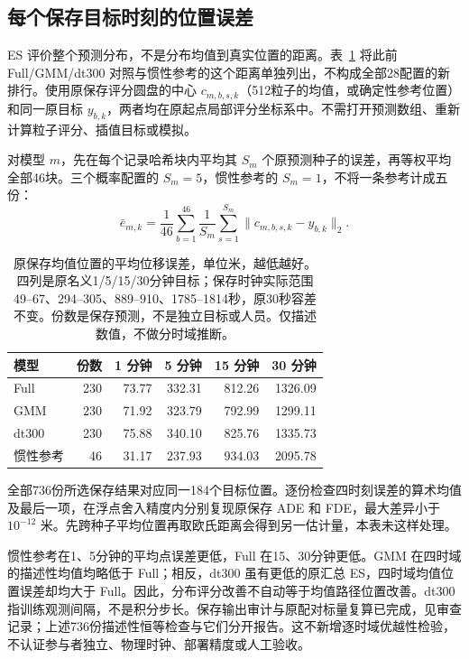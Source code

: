 \FloatBarrier
\subsection{每个保存目标时刻的位置误差}
\label{sec:point-error-horizons}
ES 评价整个预测分布，不是分布均值到真实位置的距离。表~\ref{tab:point-error-horizons} 将此前 Full/GMM/dt300 对照与惯性参考的这个距离单独列出，不构成全部28配置的新排行。使用原保存评分圆盘的中心 $c_{m,b,s,k}$（512粒子的均值，或确定性参考位置）和同一原目标 $y_{b,k}$，两者均在原起点局部评分坐标系中。不需打开预测数组、重新计算粒子评分、插值目标或模拟。

对模型 $m$，先在每个记录哈希块内平均其 $S_m$ 个原预测种子的误差，再等权平均全部46块。三个概率配置的 $S_m=5$，惯性参考的 $S_m=1$，不将一条参考计成五份：
\begin{equation}
\bar e_{m,k}=\frac{1}{46}\sum_{b=1}^{46}
\frac{1}{S_m}\sum_{s=1}^{S_m}\lVert c_{m,b,s,k}-y_{b,k}\rVert_2.
\label{eq:point-error-horizon-mean}
\end{equation}

\begin{table}[htbp]\centering\small
\caption{原保存均值位置的平均位移误差，单位米，越低越好。四列是原名义1/5/15/30分钟目标；保存时钟实际范围49--67、294--305、889--910、1785--1814秒，原30秒容差不变。份数是保存预测，不是独立目标或人员。仅描述数值，不做分时域推断。}\label{tab:point-error-horizons}
\begin{tabular}{@{}lrrrrr@{}}\toprule
模型 & 份数 & 1 分钟 & 5 分钟 & 15 分钟 & 30 分钟\\\midrule
Full & 230 & 73.77 & 332.31 & 812.26 & 1326.09\\
GMM & 230 & 71.92 & 323.79 & 792.99 & 1299.11\\
dt300 & 230 & 75.88 & 340.10 & 825.76 & 1335.73\\
惯性参考 & 46 & 31.17 & 237.93 & 934.03 & 2095.78\\
\bottomrule\end{tabular}\end{table}

全部736份所选保存结果对应同一184个目标位置。逐份检查四时刻误差的算术均值及最后一项，在浮点舍入精度内分别复现原保存 ADE 和 FDE，最大差异小于 $10^{-12}$ 米。先跨种子平均位置再取欧氏距离会得到另一估计量，本表未这样处理。

惯性参考在1、5分钟的平均点误差更低，Full 在15、30分钟更低。GMM 在四时域的描述性均值均略低于 Full；相反，dt300 虽有更低的原汇总 ES，四时域均值位置误差却均大于 Full。因此，分布评分改善不自动等于均值路径位置改善。dt300 指训练观测间隔，不是积分步长。保存输出审计与原配对标量复算已完成，见审查记录；上述736份描述性恒等检查与它们分开报告。这不新增逐时域优越性检验，不认证参与者独立、物理时钟、部署精度或人工验收。
\FloatBarrier
